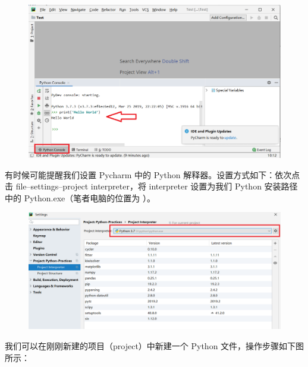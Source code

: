 \clearpage

\begin{figure}[!ht]
  \centering
  \includegraphics[scale=0.4]{figure/chapter1/pycharm4.png}
\end{figure}

有时候可能提醒我们设置 Pycharm 中的 Python 解释器。设置方式如下：依次点击 file--settings--project interpreter，将 interpreter 设置为我们 Python 安装路径中的 Python.exe（笔者电脑的位置为 ）。

\begin{figure}[!ht]
  \centering
  \includegraphics[scale=0.4]{figure/chapter1/pycharm3.png}
\end{figure}

我们可以在刚刚新建的项目（project）中新建一个 Python 文件，操作步骤如下图所示：

